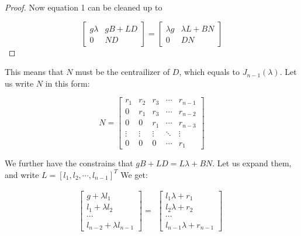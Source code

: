 \documentclass[12pt, a4paper]{article}
\theoremstyle{definition}
\theoremstyle{remark}
\begin{document}
\begin{proof}
	Now equation 1 can be cleaned up to

	\begin{equation}
		\left[
			\begin{array}{c|c}
				g \lambda & gB+LD \\
				\hline
				0         & ND
			\end{array}
			\right]
		=
		\left[
			\begin{array}{c|c}
				\lambda g & \lambda L + BN \\
				\hline
				0         & DN
			\end{array}
			\right]
	\end{equation}
\end{proof}

This means that $N$ must be the centrailizer of $D$, which equals to $J_{n-1}(\lambda)$. Let us write $N$ in this form:

\begin{equation}
	N=
	\left[
		\begin{array}{ccccc}
			r_1    & r_2    & r_3    & \cdots & r_{n-1} \\
			0      & r_1    & r_3    & \cdots & r_{n-2} \\
			0      & 0      & r_1    & \cdots & r_{n-3} \\
			\vdots & \vdots & \vdots & \ddots & \vdots  \\
			0      & 0      & 0      & \cdots & r_1
		\end{array}
		\right]
\end{equation}

We further have the constrains that $gB + LD = L \lambda +BN$. Let us expand them, and write $L = [l_1, l_2, \cdots, l_{n-1}]^T$
We get:

\begin{equation}
	\left[
		\begin{array}{c}
			g + \lambda l_1   \\
			l_1 + \lambda l_2 \\
			\cdots            \\
			l_{n-2} + \lambda l_{n-1}
		\end{array}
		\right]
	=
	\begin{array} {c}
		\left[
			\begin{array}{c}
				l_1 \lambda + r_1 \\
				l_2 \lambda + r_2 \\
				\cdots            \\
				l_{n-1} \lambda + r_{n-1}
			\end{array}
			\right]
	\end{array}
\end{equation}
\end{document}
